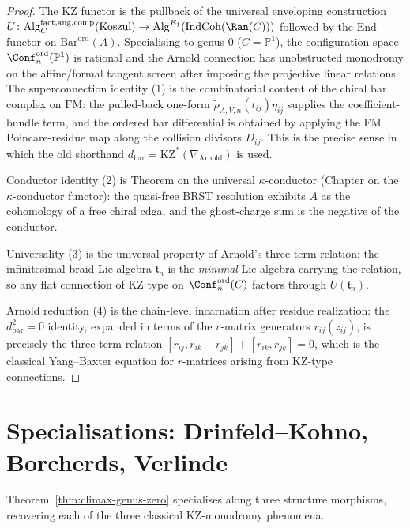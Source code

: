 \begin{proof}
The KZ functor is the pullback of the universal enveloping construction
$U \colon \mathrm{Alg}^{\mathrm{fact, aug, comp}}_C(\text{Koszul}) \to
\mathrm{Alg}^{E_1}(\mathrm{IndCoh}(\Ran(C)))$ followed by the
$\mathrm{End}$-functor on $\mathrm{Bar}^{\mathrm{ord}}(A)$. Specialising
to genus $0$ \textup{(}$C = \mathbb{P}^1$\textup{)}, the configuration
space $\Conf_n^{\mathrm{ord}}(\mathbb{P}^1)$ is rational and the Arnold
connection has unobstructed monodromy on the affine/formal tangent
screen after imposing the projective linear relations. The
superconnection identity (1) is the combinatorial content of the
chiral bar complex on \(\mathrm{FM}\): the pulled-back one-form
\(\widetilde\rho_{A,V,n}(t_{ij})\eta_{ij}\) supplies the
coefficient-bundle term, and the ordered bar differential is obtained
by applying the FM Poincare-residue map along the collision divisors
\(D_{ij}\). This is the precise sense in which the old shorthand
\(d_{\mathrm{bar}}=\mathrm{KZ}^{*}(\nabla_{\mathrm{Arnold}})\) is used.

Conductor identity (2) is Theorem on the universal $\kappa$-conductor
\textup{(}Chapter on the $\kappa$-conductor functor\textup{):} the
quasi-free BRST resolution exhibits $A$ as the cohomology of a free
chiral cdga, and the ghost-charge sum is the negative of the conductor.

Universality (3) is the universal property of Arnold's three-term
relation: the infinitesimal braid Lie algebra $\mathfrak{t}_n$ is the
\emph{minimal} Lie algebra carrying the relation, so any flat connection
of KZ type on $\Conf_n^{\mathrm{ord}}(C)$ factors through
$U(\mathfrak{t}_n)$.

Arnold reduction (4) is the chain-level incarnation after residue
realization: the \(d_{\mathrm{bar}}^2=0\) identity, expanded in terms
of the \(r\)-matrix generators \(r_{ij}(z_{ij})\), is precisely the
three-term relation
$[r_{ij}, r_{ik} + r_{jk}] + [r_{ik}, r_{jk}] = 0$, which is the
classical Yang--Baxter equation for $r$-matrices arising from KZ-type
connections.
\end{proof}

\section{Specialisations: Drinfeld--Kohno, Borcherds, Verlinde}
\label{sec:climax-specialisations}

Theorem~\ref{thm:climax-genus-zero} specialises along three structure
morphisms, recovering each of the three classical KZ-monodromy
phenomena.

